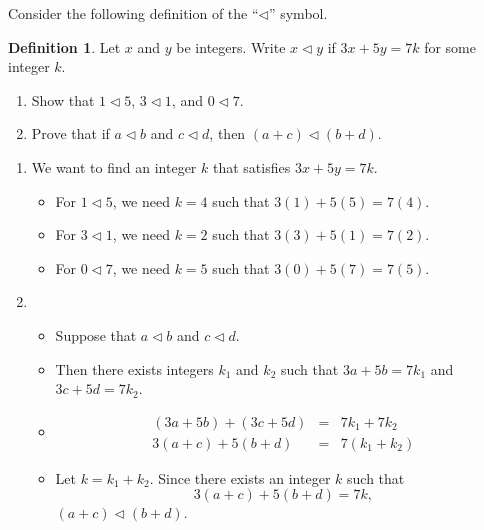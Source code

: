 \documentclass{article}
\theoremstyle{definition}
\newtheorem*{definition}{Definition}
\begin{document}
\begin{question}
Consider the following definition of the ``$\triangleleft$'' symbol.
	\begin{definition}
	Let $x$ and $y$ be integers. Write $x\triangleleft y$ if $3x+5y=7k$ for some integer $k$.
	\end{definition}
\begin{enumerate}
\item Show that $1\triangleleft 5$, $3\triangleleft 1$, and $0\triangleleft 7$.
\item Prove that if $a\triangleleft b$ and $c\triangleleft d$, then $(a+c) \triangleleft (b+d)$.
\end{enumerate}
\end{question}
\begin{solution}
\begin{enumerate}
\item We want to find an integer $k$ that satisfies $3x+5y=7k$.
	\begin{itemize}
	\item For $1\triangleleft 5$, we need $k=4$ such that $3(1)+5(5)=7(4)$.
	\item For $3\triangleleft 1$, we need $k=2$ such that $3(3)+5(1)=7(2)$.
	\item For $0\triangleleft 7$, we need $k=5$ such that $3(0)+5(7)=7(5)$.
	\end{itemize}
\item 
	\begin{itemize}
	\item Suppose that $a\triangleleft b$ and $c\triangleleft d$. 
	\item Then there exists integers $k_1$ and $k_2$ such that $3a+5b=7k_1$ and $3c+5d=7k_2$.
	\item \begin{eqnarray*}
	(3a+5b) + (3c+5d) &=& 7k_1 + 7k_2\\
	3(a+c) + 5(b + d) &=& 7(k_1+k_2)
	\end{eqnarray*}
	\item Let $k=k_1+k_2$. Since there exists an integer $k$ such that $$3(a+c) + 5(b + d)=7k,$$ $(a+c) \triangleleft (b+d)$.
	\end{itemize}
\end{enumerate}
\end{solution}
\end{document}
